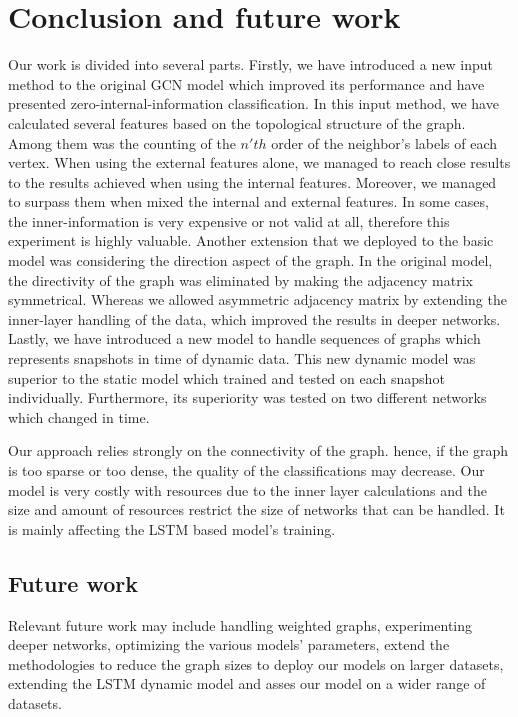 \chapter{Conclusion and future work}
\label{chap:conclusion}

Our work is divided into several parts.
Firstly, we have introduced a new input method to the original GCN model which improved its performance and have presented zero-internal-information classification.
In this input method, we have calculated several features based on the topological structure of the graph. Among them was the counting of the $n'th$ order of the neighbor's labels of each vertex.
When using the external features alone, we managed to reach close results to the results achieved when using the internal features. Moreover, we managed to surpass them when mixed the internal and external features.
In some cases, the inner-information is very expensive or not valid at all, therefore this experiment is highly valuable.
Another extension that we deployed to the basic model was considering the direction aspect of the graph. In the original model, the directivity of the graph was eliminated by making the adjacency matrix symmetrical. Whereas we allowed asymmetric adjacency matrix by extending the inner-layer handling of the data, which improved the results in deeper networks.
Lastly, we have introduced a new model to handle sequences of graphs which represents snapshots in time of dynamic data.
This new dynamic model was superior to the static model which trained and tested on each snapshot individually. Furthermore, its superiority was tested on two different networks which changed in time.

Our approach relies strongly on the connectivity of the graph. hence, if the graph is too sparse or too dense, the quality of the classifications may decrease.
Our model is very costly with resources due to the inner layer calculations and the size and amount of resources restrict the size of networks that can be handled. It is mainly affecting the LSTM based model's training.

\section{Future work}
Relevant future work may include handling weighted graphs, experimenting deeper networks, optimizing the various models' parameters, extend the methodologies to reduce the graph sizes to deploy our models on larger datasets, extending the LSTM dynamic model and asses our model on a wider range of datasets.
